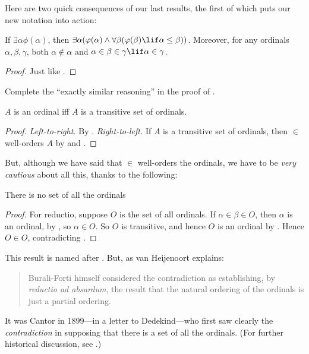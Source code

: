 \documentclass[../../../include/open-logic-section]{subfiles}
\begin{document}
Here are two quick consequences of our last results, the first of
which puts our new notation into action:

\begin{cor}
If $\exists \alpha\phi(\alpha)$, then $\exists \alpha(\phi(\alpha)
\land \forall \beta(\phi(\beta) \lif \alpha \leq \beta))$.
Moreover, for any ordinals $\alpha, \beta, \gamma$, both $\alpha
\notin \alpha$ and $\alpha \in \beta \in \gamma \lif \alpha \in
\gamma$. 
\end{cor}

\begin{proof}
Just like .
\end{proof}

\begin{prob}
Complete the ``exactly similar reasoning'' in the proof of
.
\end{prob}

\begin{cor}
$A$ is an ordinal iff $A$ is a transitive set of ordinals.
\end{cor}

\begin{proof}
\emph{Left-to-right.} By . \emph{Right-to-left.}
If $A$ is a transitive set of ordinals, then $\in$ well-orders $A$ by
 and .
\end{proof}

But, although we have said that $\in$ well-orders the ordinals, we
have to be \emph{very cautious} about all this, thanks to the
following:

\begin{thm}
There is no set of all the ordinals
\end{thm}

\begin{proof}
For reductio, suppose $O$ is the set of all ordinals. If $\alpha \in
\beta \in O$, then $\alpha$ is an ordinal, by , so
$\alpha \in O$. So $O$ is transitive, and hence $O$ is an ordinal by
. Hence $O \in O$, contradicting
. 
\end{proof}

This result is named after \citeauthor{Burali-Forti1897}. But, as van
Heijenoort explains:
\begin{quote}
  Burali-Forti himself considered the contradiction as establishing,
  by \emph{reductio ad absurdum}, the result that the natural ordering
  of the ordinals is just a partial ordering.
  \citep[p.~105]{Heijenoort1967}
\end{quote}
It was Cantor in 1899---in a letter to Dedekind---who first saw
clearly the \emph{contradiction} in supposing that there is a set of
all the ordinals. (For further historical discussion, see
\citealt[p.~105]{Heijenoort1967}.)
\end{document}

